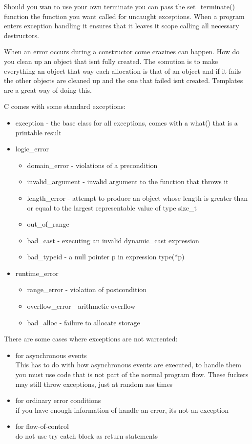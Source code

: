 \documentclass[12pt]{article}
\begin{document}
Should you wan to use your own terminate you can pass the set\_terminate() function the function you want called for uncaught exceptions. When a program enters exception handling it ensures that it leaves it scope calling all necessary destructors.

When an error occurs during a constructor come crazines can happen. How do you clean up an object that isnt fully created. The somution is to make everything an object that way each allocation is that of an object and if it fails the other objects are cleaned up and the one that failed isnt created. Templates are a great way of doing this.

C comes with some standard exceptions:
\begin{itemize}
    \item  exception - the base class for all exceptions, comes with a what() that is a printable result
    \item logic\_error
    \begin{itemize}
        \item domain\_error - violations of a precondition
        \item invalid\_argument - invalid argument to the function that throws it
        \item length\_error - attempt to produce an object whose length is greater than or equal to the largest representable value of type size\_t
        \item out\_of\_range
        \item bad\_cast - executing an invalid dynamic\_cast expression
        \item bad\_typeid - a null pointer p in expression type(*p)
    \end{itemize}
    \item runtime\_error
    \begin{itemize}
        \item range\_error - violation of postcondition
        \item overflow\_error - arithmetic overflow
        \item bad\_alloc - failure to allocate storage
    \end{itemize}
\end{itemize}

There are some cases where exceptions are not warrented:
\begin{itemize}
    \item for asynchronous events\\
    This has to do with how asynchronous events are executed, to handle them you must use code that is not part of the normal program flow. These fuckers may still throw exceptions, just at random ass times
    \item for ordinary error conditions\\
    if you have enough information of handle an error, its not an exception
    \item for flow-of-control\\
    do not use try catch block as return statements
\end{itemize}
\end{document}
